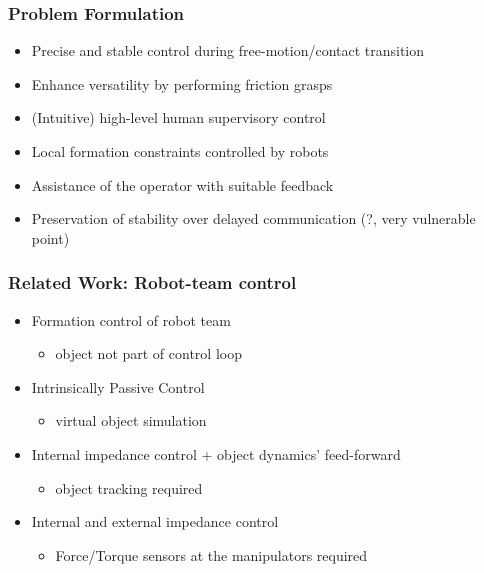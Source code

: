 \documentclass[student]{ITRslides}
\begin{document}
\begin{frame}
	\frametitle{Problem Formulation}

	\begin{itemize}
		\item Precise and stable control during free-motion/contact transition
		\item Enhance versatility by performing friction grasps
		\item (Intuitive) high-level human supervisory control
		\item Local formation constraints controlled by robots
		\item Assistance of the operator with suitable feedback
		\item Preservation of stability over delayed communication (?, very vulnerable point) 
	\end{itemize}

\end{frame}

\begin{frame}
	\frametitle{Related Work: Robot-team control}
	\begin{itemize}
		\item Formation control of robot team \cite{Sieber_15,Wimboeck_06}
		\begin{itemize}
			\item object not part of control loop
		\end{itemize}
		\item Intrinsically Passive Control \cite{Stramigioli_01, Wimboeck_08}
		\begin{itemize}
			\item virtual object simulation
		\end{itemize}
		\item Internal impedance control + object dynamics' feed-forward \cite{DePascali_15}
				\begin{itemize}
			\item object tracking required
		\end{itemize}
		\item Internal and external impedance control \cite{Caccavale_01,Caccavale_08}
			\begin{itemize}
			\item Force/Torque sensors at the manipulators required
			\end{itemize}
	\end{itemize}
\end{frame}
\end{document}
